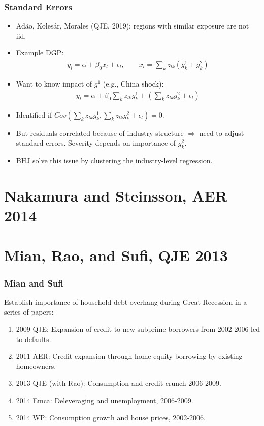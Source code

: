 \documentclass[english,xcolor=svgnames]{beamer}
\begin{document}
\begin{frame}
\frametitle[alignment=center]{Standard Errors}
\begin{itemize}
	\item Ad\~{a}o, Koles\'{a}r, Morales (QJE, 2019): regions with similar exposure are not iid.
	\item Example DGP:
	\begin{align*}
		y_l = \alpha+\beta_0 x_l + \epsilon_l ,\qquad x_l = \sum_k z_{lk}(g_k^1 + g_k^2)
	\end{align*}
	\item Want to know impact of $g^1$ (e.g., China shock):
	\begin{align*}
		y_l = \alpha+\beta_0 \sum_k z_{lk}g_k^1 + (\sum_k z_{lk}g_k^2 + \epsilon_l)
	\end{align*}
	\item Identified if $Cov(\sum_k z_{lk}g_k^1,\sum_k z_{lk}g_k^2 + \epsilon_l) = 0$.
	\item But residuals correlated because of industry structure $\Rightarrow$ need to adjust standard errors. Severity depends on importance of $g_k^2$.
	\item BHJ solve this issue by clustering the industry-level regression.
\end{itemize}
\end{frame}





\section{Nakamura and Steinsson, AER 2014}

\section{Mian, Rao, and Sufi, QJE 2013}


\begin{frame}
\frametitle[alignment=center]{Mian and Sufi}
Establish importance of household debt overhang during Great Recession in a series of papers:\\
\begin{enumerate}
	\item 2009 QJE: Expansion of credit to new subprime borrowers from 2002-2006 led to defaults.
	\item 2011 AER: Credit expansion through home equity borrowing by existing homeowners.
	\item 2013 QJE (with Rao): Consumption and credit crunch 2006-2009.
	\item 2014 Emca: Deleveraging and unemployment, 2006-2009.
	\item 2014 WP: Consumption growth and house prices, 2002-2006.
\end{enumerate}
\end{frame}
\end{document}
